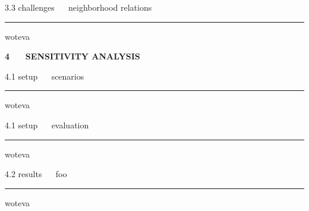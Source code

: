 \documentclass[11pt, compress, t, notes = noshow, xcolor = table, 
aspectratio = 1610]{beamer}
\newcommand{\highlight}[1]{\textcolor{highlightcol}{\textbf{#1}}}
\begin{document}
\LARGE
\begin{frame}{\textcolor{gray!90}{3.3 challenges} ~~ neighborhood relations}
\normalsize
\vspace{-0.5cm}
\noindent \textcolor{gray!90}{\rule{\textwidth}{1pt}}


\medskip

woteva

\end{frame}


\begin{frame}{}

\Huge
\hspace{0pt}
\vfill
\textbf{\highlight{4 ~~ SENSITIVITY ANALYSIS}}
\vfill
\hspace{0pt}

\end{frame}


\LARGE
\begin{frame}{\textcolor{gray!90}{4.1 setup} ~~ scenarios}
\normalsize
\vspace{-0.5cm}
\noindent \textcolor{gray!90}{\rule{\textwidth}{1pt}}


\medskip

woteva

\end{frame}


\LARGE
\begin{frame}{\textcolor{gray!90}{4.1 setup} ~~ evaluation}
\normalsize
\vspace{-0.5cm}
\noindent \textcolor{gray!90}{\rule{\textwidth}{1pt}}


\medskip

woteva

\end{frame}


\LARGE
\begin{frame}{\textcolor{gray!90}{4.2 results} ~~ foo}
\normalsize
\vspace{-0.5cm}
\noindent \textcolor{gray!90}{\rule{\textwidth}{1pt}}


\medskip

woteva

\end{frame}
\end{document}
